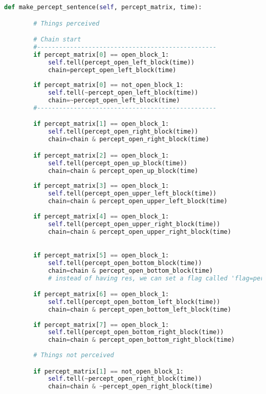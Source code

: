 \begin{lstlisting}[language=Python, caption=Agent Sensor Implmentation.]
def make_percept_sentence(self, percept_matrix, time):

        # Things perceived

        # Chain start
        #-------------------------------------------------
        if percept_matrix[0] == open_block_1:
            self.tell(percept_open_left_block(time))
            chain=percept_open_left_block(time)
            
        if percept_matrix[0] == not_open_block_1:
            self.tell(~percept_open_left_block(time))
            chain=~percept_open_left_block(time)
        #-------------------------------------------------

        if percept_matrix[1] == open_block_1:
            self.tell(percept_open_right_block(time))
            chain=chain & percept_open_right_block(time)

        if percept_matrix[2] == open_block_1:
            self.tell(percept_open_up_block(time))
            chain=chain & percept_open_up_block(time)
            
        if percept_matrix[3] == open_block_1:
            self.tell(percept_open_upper_left_block(time))
            chain=chain & percept_open_upper_left_block(time)
        
        if percept_matrix[4] == open_block_1:
            self.tell(percept_open_upper_right_block(time))
            chain=chain & percept_open_upper_right_block(time)

            
        if percept_matrix[5] == open_block_1:
            self.tell(percept_open_bottom_block(time))
            chain=chain & percept_open_bottom_block(time)
            # instead of having res, we can set a flag called 'flag=percept_open_bottom_block(time)' and then chain on other percept sentences

        if percept_matrix[6] == open_block_1:
            self.tell(percept_open_bottom_left_block(time))
            chain=chain & percept_open_bottom_left_block(time)
            
        if percept_matrix[7] == open_block_1:
            self.tell(percept_open_bottom_right_block(time))
            chain=chain & percept_open_bottom_right_block(time)
            
        # Things not perceived  

        if percept_matrix[1] == not_open_block_1:
            self.tell(~percept_open_right_block(time))
            chain=chain & ~percept_open_right_block(time)


\end{lstlisting}
